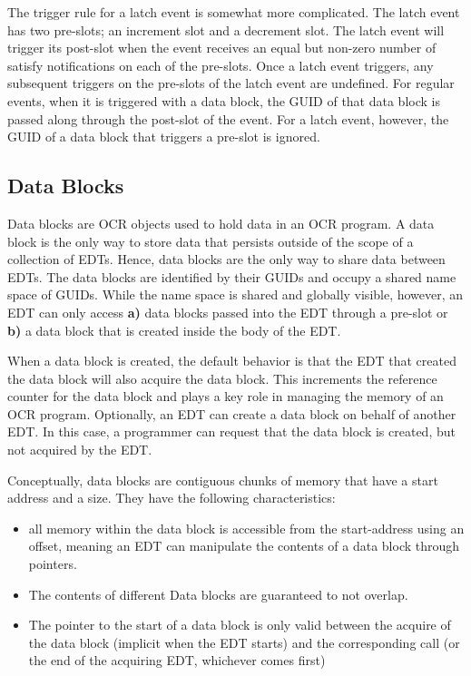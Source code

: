 The trigger rule for a latch event is somewhat more complicated. The
latch event has two pre-slots; an increment slot and a decrement
slot. The latch event will trigger its post-slot when the event
receives an equal but non-zero number of satisfy notifications on each
of the pre-slots. Once a latch event triggers, any subsequent
triggers on the pre-slots of the latch event are undefined. For
regular events, when it is triggered with a data block, the GUID of
that data block is passed along through the post-slot of the
event. For a latch event, however, the GUID of a data block that
triggers a pre-slot is ignored.

\subsection{Data Blocks}
\label{sec:datablocks}
Data blocks are OCR objects used to hold data in an OCR program. A
data block is the only way to store data that persists outside of the
scope of a collection of EDTs. Hence, data blocks are the only way to
share data between EDTs. The data blocks are identified by their
GUIDs and occupy a shared name space of GUIDs. While the name space
is shared and globally visible, however, an EDT can only access {\bf a)}
data blocks passed into the EDT through a pre-slot or {\bf b)} a data block
that is created inside the body of the EDT.

When a data block is created, the default behavior is that the EDT
that created the data block will also acquire the data block. This
increments the reference counter for the data block and plays a key
role in managing the memory of an OCR program. Optionally, an EDT can
create a data block on behalf of another EDT. In this case, a
programmer can request that the data block is created, but not
acquired by the EDT.

Conceptually, data blocks are contiguous chunks of memory
that have a start address and a size. They have the following characteristics:
\begin{itemize}
\item all memory within the data block is accessible from the
start-address using an offset, meaning an EDT can manipulate the
contents of a data block through pointers.
\item The contents of different Data blocks are guaranteed to not
overlap.
\item The pointer to the start of a data block is only valid between
the acquire of the data block (implicit when the EDT starts) and the
corresponding  call (or the end of the acquiring
EDT, whichever comes first)
\end{itemize}


